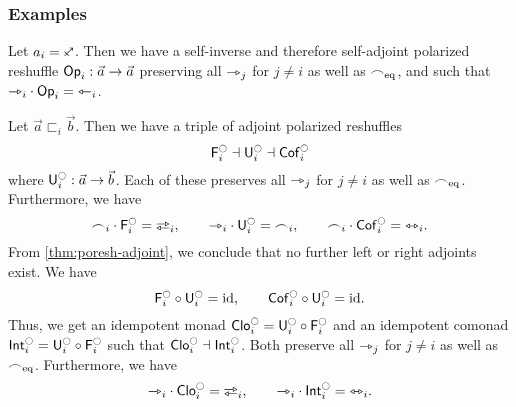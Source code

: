 \documentclass[a4paper]{memoir}
\begin{document}

\subsubsection{Examples}
\begin{example} \label{ex:poresh-op}
	Let $a_i = \ypolar$.
	Then we have a self-inverse and therefore self-adjoint polarized reshuffle ${\mathsf{Op}}_i : \vec a \to \vec a$ preserving all ${\rightarrowtriangle}_j$ for $j \neq i$ as well as ${\frown}_{{\mathrm{eq}}}$, and such that ${\rightarrowtriangle}_i \cdot {\mathsf{Op}}_i = {\leftarrowtriangle}_i$.
\end{example}
\begin{example} \label{ex:poresh-sym}
	Let $\vec a \sqsubset_i \vec b$.
	Then we have a triple of adjoint polarized reshuffles
	\[
		\Fsymresh_i \dashv \Usymresh_i \dashv \Csymresh_i
	\]
	where $\Usymresh_i : \vec a \to \vec b$.
	Each of these preserves all ${\rightarrowtriangle}_j$ for $j \neq i$ as well as ${\frown}_{{\mathrm{eq}}}$. Furthermore, we have
	\[
		\edgesym_i \cdot \Fsymresh_i = \infrajetsym_i, \qquad
		\jetsym_i \cdot \Usymresh_i = \edgesym_i, \qquad
		\edgesym_i \cdot \Csymresh_i = \equijetsym_i.
	\]
	From \cref{thm:poresh-adjoint}, we conclude that no further left or right adjoints exist. We have
	\[
		\Fsymresh_i \circ \Usymresh_i = \id, \qquad \Csymresh_i \circ \Usymresh_i = \id.
	\]
	Thus, we get an idempotent monad $\UFsymresh_i = \Usymresh_i \circ \Fsymresh_i$ and an idempotent comonad $\UCsymresh_i = \Usymresh_i \circ \Fsymresh_i$ such that $\UFsymresh_i \dashv \UCsymresh_i$.
	Both preserve all ${\rightarrowtriangle}_j$ for $j \neq i$ as well as ${\frown}_{{\mathrm{eq}}}$. Furthermore, we have
	\[
		\jetsym_i \cdot \UFsymresh_i = \infrajetsym_i, \qquad
		\jetsym_i \cdot \UCsymresh_i = \equijetsym_i.
	\]
\end{example}
\end{document}
